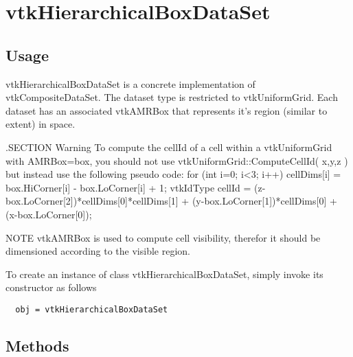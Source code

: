 \section{vtkHierarchicalBoxDataSet}

\subsection{Usage}

 vtkHierarchicalBoxDataSet is a concrete implementation of
 vtkCompositeDataSet. The dataset type is restricted to
 vtkUniformGrid. Each dataset has an associated vtkAMRBox that represents
 it's region (similar to extent) in space.

 .SECTION Warning
 To compute the cellId of a cell within a vtkUniformGrid with AMRBox=box, 
 you should not use vtkUniformGrid::ComputeCellId( {x,y,z} ) but instead
 use the following pseudo code:
 for (int i=0; i<3; i++)
   {
   cellDims[i] = box.HiCorner[i] - box.LoCorner[i] + 1;
   }
 vtkIdType cellId =
   (z-box.LoCorner[2])*cellDims[0]*cellDims[1] +
   (y-box.LoCorner[1])*cellDims[0] +
   (x-box.LoCorner[0]);

 NOTE vtkAMRBox is used to compute cell visibility, therefor it 
 should be dimensioned according to the visible region.

To create an instance of class vtkHierarchicalBoxDataSet, simply
invoke its constructor as follows
\begin{verbatim}
  obj = vtkHierarchicalBoxDataSet
\end{verbatim}
\subsection{Methods}

